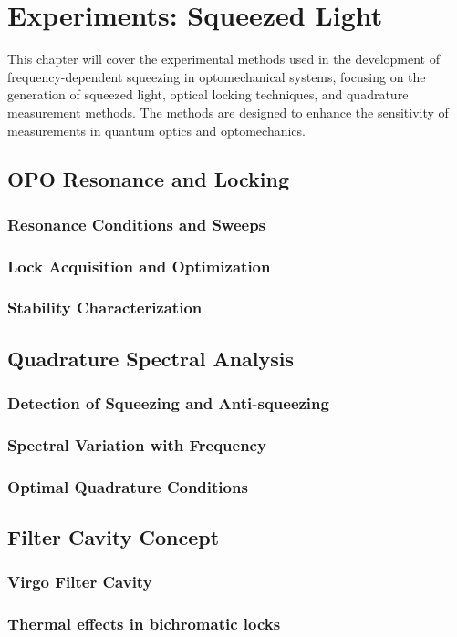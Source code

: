 \chapter{Experiments: Squeezed Light}
This chapter will cover the experimental methods used in the development of frequency-dependent squeezing in optomechanical systems, focusing on the generation of squeezed light, optical locking techniques, and quadrature measurement methods. The methods are designed to enhance the sensitivity of measurements in quantum optics and optomechanics.
\minitoc
\newpage 

\section{OPO Resonance and Locking}
\subsection{Resonance Conditions and Sweeps}
\subsection{Lock Acquisition and Optimization}
\subsection{Stability Characterization}
\section{Quadrature Spectral Analysis}
\subsection{Detection of Squeezing and Anti-squeezing}
\subsection{Spectral Variation with Frequency}
\subsection{Optimal Quadrature Conditions}
\section{Filter Cavity Concept}
\subsection{Virgo Filter Cavity }
\subsection{Thermal effects in bichromatic locks}